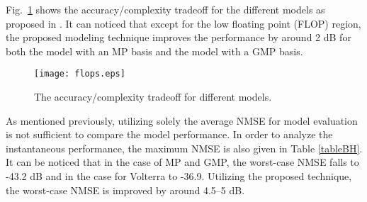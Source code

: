 \documentclass[journal]{IEEEtran}
\begin{document}
Fig.~\ref{flops} shows the accuracy/complexity tradeoff for the different models as proposed in \cite{soltani}. It can noticed that except for the low floating point (FLOP) region, the proposed modeling technique improves the performance by around 2 dB for both the model with an MP basis and the model with a GMP basis.
\begin{figure}
\centering
\texttt{[image: flops.eps]}
\caption{The accuracy/complexity tradeoff for different models.} \label{flops}
\end{figure}

As mentioned previously, utilizing solely the average NMSE for model evaluation is not sufficient to compare the model performance. In order to analyze the instantaneous performance, the maximum NMSE is also given in Table \ref{tableBH}. It can be noticed that in the case of MP and GMP, the worst-case NMSE falls to -43.2 dB and in the case for Volterra to -36.9. Utilizing the proposed technique, the worst-case NMSE is improved by around 4.5--5 dB.
\begin{table}
\caption{Comparison of behavioral modeling performance for the proposed modeling technique and MP and GMP. Model orders are shown in the parenthesis and are chosen for relatively similar complexity.} 
\end{table}
\end{document}
